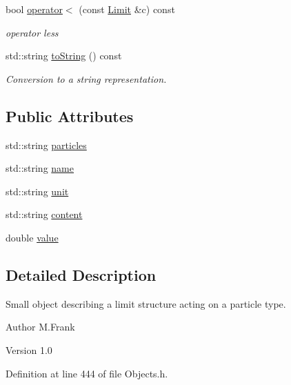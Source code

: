 \begin{DoxyCompactItemize}
bool \hyperlink{class_d_d4hep_1_1_geometry_1_1_limit_a23ebb997ee827b26d0eb6f714d8fad94}{operator$<$} (const \hyperlink{class_d_d4hep_1_1_geometry_1_1_limit}{Limit} \&c) const 
\begin{DoxyCompactList}\small\item\em operator less \item\end{DoxyCompactList}\item 
std::string \hyperlink{class_d_d4hep_1_1_geometry_1_1_limit_a4457a562ae609ecb9dcec740d7270e89}{toString} () const 
\begin{DoxyCompactList}\small\item\em Conversion to a string representation. \item\end{DoxyCompactList}\end{DoxyCompactItemize}
\subsection*{Public Attributes}
\begin{DoxyCompactItemize}
\item 
std::string \hyperlink{class_d_d4hep_1_1_geometry_1_1_limit_a44351a38f5e876a67898568c5ca4d4a6}{particles}
\item 
std::string \hyperlink{class_d_d4hep_1_1_geometry_1_1_limit_ad1cec0ce58b0158ef8ba97d0a066cb28}{name}
\item 
std::string \hyperlink{class_d_d4hep_1_1_geometry_1_1_limit_a60bf4c5f1e2847c0dde17d54abaffffb}{unit}
\item 
std::string \hyperlink{class_d_d4hep_1_1_geometry_1_1_limit_aafcf490f74d6001a5dde9d9c6061e694}{content}
\item 
double \hyperlink{class_d_d4hep_1_1_geometry_1_1_limit_af3c5aac5f2991f137749634caf9e49cc}{value}
\end{DoxyCompactItemize}


\subsection{Detailed Description}
Small object describing a limit structure acting on a particle type. \begin{DoxyAuthor}{Author}
M.Frank 
\end{DoxyAuthor}
\begin{DoxyVersion}{Version}
1.0 
\end{DoxyVersion}


Definition at line 444 of file Objects.h.

